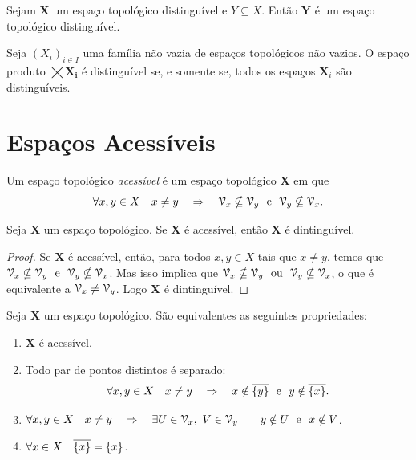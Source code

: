 \begin{prop}
	Sejam $\bm X$ um espaço topológico distinguível e $Y \subseteq X$. Então $\bm Y$ é um espaço topológico distinguível.
\end{prop}

\begin{prop}
	Seja $(X_i)_{i \in I}$ uma família não vazia de espaços topológicos não vazios. O espaço produto $\bm{\bigtimes X_i}$ é distinguível se, e somente se, todos os espaços $\bm X_i$ são distinguíveis.
\end{prop}

\section{Espaços Acessíveis}

\begin{defi}[$T_1$]
	Um espaço topológico \emph{acessível} é um espaço topológico $\bm X$ em que
	\begin{equation*}
	\forall x,y \in X \quad x \neq y \quad \Rightarrow \quad \mathcal{V}_x \nsubseteq \mathcal{V}_y \text{\ \ e\ \ } \mathcal{V}_y \nsubseteq \mathcal{V}_x.
	\end{equation*}
\end{defi}

\begin{prop}[$T_1 \Rightarrow T_0$]
	Seja $\bm X$ um espaço topológico. Se $\bm X$ é acessível, então $\bm X$ é dintinguível.
\end{prop}
\begin{proof}
	Se $\bm X$ é acessível, então, para todos $x,y \in X$ tais que $x \neq y$, temos que $\mathcal{V}_x \nsubseteq \mathcal{V}_y \text{\ \ e\ \ } \mathcal{V}_y \nsubseteq \mathcal{V}_x$. Mas isso implica que $\mathcal{V}_x \nsubseteq \mathcal{V}_y \text{\ \ ou\ \ } \mathcal{V}_y \nsubseteq \mathcal{V}_x$, o que é equivalente a $\mathcal{V}_x \neq \mathcal{V}_y$. Logo $\bm X$ é dintinguível.
\end{proof}

\begin{prop}
	Seja $\bm X$ um espaço topológico. São equivalentes as seguintes propriedades:
	\begin{enumerate}
	\item $\bm X$ é acessível.
	\item Todo par de pontos distintos é separado:
		\begin{equation*}
		\forall x,y \in X \quad x \neq y \quad \Rightarrow \quad x \notin \overline{\{y\}} \text{\ \ e\ \ } y \notin \overline{\{x\}}.
		\end{equation*}
	\item $\forall x,y \in X \quad x \neq y \quad \Rightarrow \quad \exists U \in \mathcal{V}_x,\ V \in \mathcal{V}_y \qquad y \notin U \text{\ \ e\ \ } x \notin V$.
	\item $\forall x \in X \quad \overline{\{x\}}=\{x\}$.
	\end{enumerate}
\end{prop}

